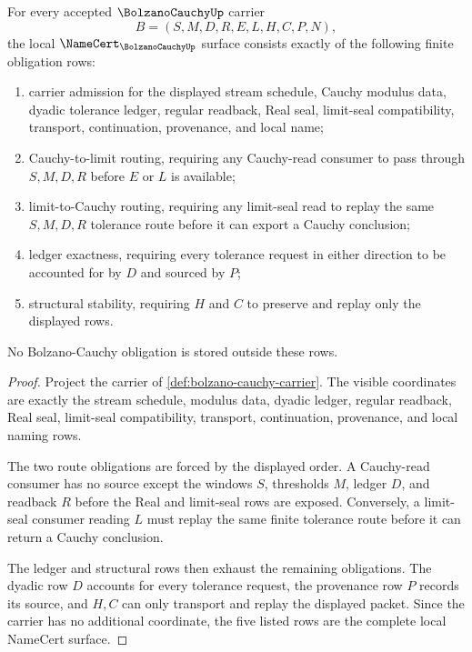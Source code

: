 \begin{theorem}
\label{thm:bolzano-cauchy-namecert-obligations}
For every accepted $\BolzanoCauchyUp$ carrier
$$
B=(S,M,D,R,E,L,H,C,P,N),
$$
the local $\NameCert_{\BolzanoCauchyUp}$ surface consists exactly of the following finite obligation rows:
\begin{enumerate}
\item carrier admission for the displayed stream schedule, Cauchy modulus data, dyadic tolerance ledger, regular readback, Real seal, limit-seal compatibility, transport, continuation, provenance, and local name;
\item Cauchy-to-limit routing, requiring any Cauchy-read consumer to pass through $S,M,D,R$ before $E$ or $L$ is available;
\item limit-to-Cauchy routing, requiring any limit-seal read to replay the same $S,M,D,R$ tolerance route before it can export a Cauchy conclusion;
\item ledger exactness, requiring every tolerance request in either direction to be accounted for by $D$ and sourced by $P$;
\item structural stability, requiring $H$ and $C$ to preserve and replay only the displayed rows.
\end{enumerate}
No Bolzano-Cauchy obligation is stored outside these rows.
\end{theorem}
\begin{proof}
Project the carrier of \autoref{def:bolzano-cauchy-carrier}. The visible coordinates are exactly the stream schedule, modulus data, dyadic ledger, regular readback, Real seal, limit-seal compatibility, transport, continuation, provenance, and local naming rows.

The two route obligations are forced by the displayed order. A Cauchy-read consumer has no source except the windows $S$, thresholds $M$, ledger $D$, and readback $R$ before the Real and limit-seal rows are exposed. Conversely, a limit-seal consumer reading $L$ must replay the same finite tolerance route before it can return a Cauchy conclusion.

The ledger and structural rows then exhaust the remaining obligations. The dyadic row $D$ accounts for every tolerance request, the provenance row $P$ records its source, and $H,C$ can only transport and replay the displayed packet. Since the carrier has no additional coordinate, the five listed rows are the complete local NameCert surface.
\end{proof}

